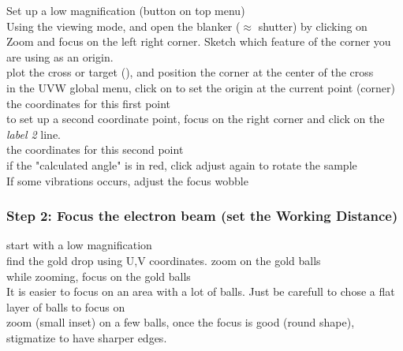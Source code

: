 Set up a low magnification (button on top menu)\\

Using the viewing mode, and open the blanker ($\approx$ shutter) by clicking on \\

Zoom and focus on the left right corner. Sketch which feature of the corner you are using as an origin.\\

plot the cross or target (), and position the corner at the center of the cross\\

in the UVW global menu, click on  to set the origin at the current point (corner)\\

 the coordinates for this first point\\

to set up a second coordinate point, focus on the right corner and click  on the \textit{label 2} line.\\

 the coordinates for this second point\\

if the "calculated angle" is in red, click adjust again to rotate the sample\\

If some vibrations occurs, adjust the focus wobble\\


\subsubsection{Step 2: Focus the electron beam (set the Working Distance)}

 start with a low magnification\\

find the gold drop using U,V coordinates.
zoom on the gold balls\\

while zooming, focus on the gold balls\\
It is easier to focus on an area with a lot of balls. Just be carefull to chose a flat layer of balls to focus on\\

zoom (small inset) on a few balls, once the focus is good (round shape), stigmatize to have sharper edges.\\

